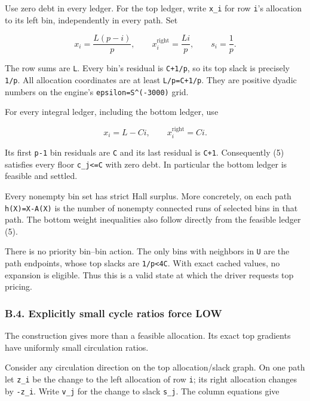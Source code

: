 Use zero debt in every ledger. For the top ledger, write \texttt{x\_i} for row \texttt{i}'s allocation to its left bin, independently in every path. Set

\[
x_i=\frac{L(p-i)}p,\qquad x_i^{\mathrm{right}}=\frac{Li}p,\qquad s_i=\frac1p.\tag{4}
\]

The row sums are \texttt{L}. Every bin's residual is \texttt{C+1/p}, so its top slack is precisely \texttt{1/p}. All allocation coordinates are at least \texttt{L/p=C+1/p}. They are positive dyadic numbers on the engine's \texttt{epsilon=S\^{}(-3000)} grid.

For every integral ledger, including the bottom ledger, use

\[
x_i=L-Ci,\qquad x_i^{\mathrm{right}}=Ci.\tag{5}
\]

Its first \texttt{p-1} bin residuals are \texttt{C} and its last residual is \texttt{C+1}. Consequently (5) satisfies every floor \texttt{c\_j\textless{}=C} with zero debt. In particular the bottom ledger is feasible and settled.

Every nonempty bin set has strict Hall surplus. More concretely, on each path \texttt{h(X)=\textbar{}X\textbar{}-\textbar{}A(X)\textbar{}} is the number of nonempty connected runs of selected bins in that path. The bottom weight inequalities also follow directly from the feasible ledger (5).

There is no priority bin--bin action. The only bins with neighbors in \texttt{U} are the path endpoints, whose top slacks are \texttt{1/p\textless{}4C}. With exact cached values, no expansion is eligible. Thus this is a valid state at which the driver requests top pricing.

\hypertarget{af-f687f276ee-b.4.-explicitly-small-cycle-ratios-force-low}{%
\subsubsection{B.4. Explicitly small cycle ratios force LOW}\label{af-f687f276ee-b.4.-explicitly-small-cycle-ratios-force-low}}

The construction gives more than a feasible allocation. Its exact top gradients have uniformly small circulation ratios.

Consider any circulation direction on the top allocation/slack graph. On one path let \texttt{z\_i} be the change to the left allocation of row \texttt{i}; its right allocation changes by \texttt{-z\_i}. Write \texttt{v\_j} for the change to slack \texttt{s\_j}. The column equations give

